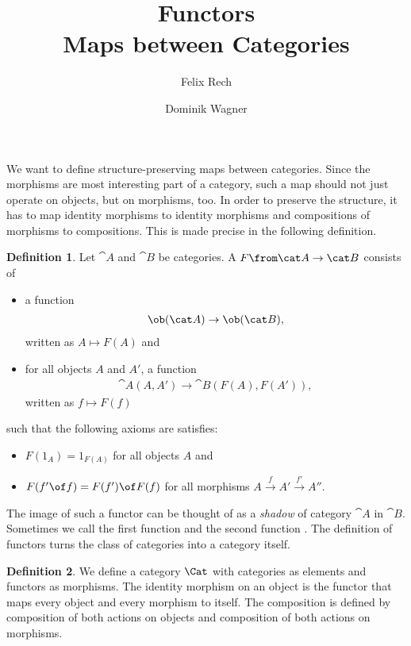 \documentclass{article}
\theoremstyle{definition}
\newtheorem{definition}{Definition}
\begin{document}
\title{Functors \\ Maps between Categories}
\author{Felix Rech \and Dominik Wagner}
\maketitle

We want to define structure-preserving maps between categories.
Since the morphisms are most interesting part of a category, such a map should not just operate on objects, but on morphisms, too.
In order to preserve the structure, it has to map identity morphisms to identity morphisms and compositions of morphisms to compositions.
This is made precise in the following definition.

\begin{definition}
  Let $\cat A$ and $\cat B$ be categories. A  $F \from \cat A\to\cat B$ consists of
    \begin{itemize}
    \item a function
      \begin{align*}
        \ob(\cat A)\to\ob(\cat B),
      \end{align*}
      written as $A\mapsto F(A)$ and
    \item for all objects $A$ and $A'$, a function
      \begin{align*}
        \cat A(A,A')\to\cat B(F(A),F(A')),
      \end{align*}
      written as $f\mapsto F(f)$
    \end{itemize}
    such that the following axioms are satisfies:
    \begin{itemize}
    \item $F(1_A)=1_{F(A)}$ for all objects $A$ and
    \item $F(f'\of f)=F(f')\of F(f)$ for all morphisms $A\xrightarrow{f}A'\xrightarrow{f'}A''$.
    \end{itemize}
\end{definition}

The image of such a functor can be thought of as a \textit{shadow} of category $\cat{A}$ in $\cat{B}$.
Sometimes we call the first function  and the second function .
The definition of functors turns the class of categories into a category itself.

\begin{definition}
  We define a category $\Cat$ with categories as elements and functors as morphisms.
  The identity morphism on an object is the functor that maps every object and every morphism to itself.
  The composition is defined by composition of both actions on objects and composition of both actions on morphisms.
\end{definition}
\end{document}
